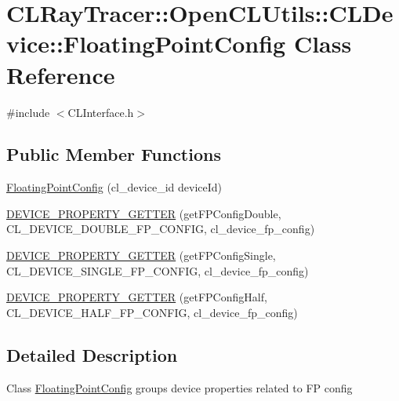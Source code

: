 \hypertarget{class_c_l_ray_tracer_1_1_open_c_l_utils_1_1_c_l_device_1_1_floating_point_config}{}\section{C\+L\+Ray\+Tracer\+:\+:Open\+C\+L\+Utils\+:\+:C\+L\+Device\+:\+:Floating\+Point\+Config Class Reference}
\label{class_c_l_ray_tracer_1_1_open_c_l_utils_1_1_c_l_device_1_1_floating_point_config}


{\ttfamily \#include $<$C\+L\+Interface.\+h$>$}

\subsection*{Public Member Functions}
\begin{DoxyCompactItemize}
\item 
\hyperlink{class_c_l_ray_tracer_1_1_open_c_l_utils_1_1_c_l_device_1_1_floating_point_config_a748826546a7d54bc90f9fed13c65bb7b}{Floating\+Point\+Config} (cl\+\_\+device\+\_\+id device\+Id)
\item 
\hyperlink{class_c_l_ray_tracer_1_1_open_c_l_utils_1_1_c_l_device_1_1_floating_point_config_a839e27c7d2ee35c0e375fbb31cdc829e}{D\+E\+V\+I\+C\+E\+\_\+\+P\+R\+O\+P\+E\+R\+T\+Y\+\_\+\+G\+E\+T\+T\+ER} (get\+F\+P\+Config\+Double, C\+L\+\_\+\+D\+E\+V\+I\+C\+E\+\_\+\+D\+O\+U\+B\+L\+E\+\_\+\+F\+P\+\_\+\+C\+O\+N\+F\+IG, cl\+\_\+device\+\_\+fp\+\_\+config)
\item 
\hyperlink{class_c_l_ray_tracer_1_1_open_c_l_utils_1_1_c_l_device_1_1_floating_point_config_a6429248cc2e9f877033c841ee3a1448a}{D\+E\+V\+I\+C\+E\+\_\+\+P\+R\+O\+P\+E\+R\+T\+Y\+\_\+\+G\+E\+T\+T\+ER} (get\+F\+P\+Config\+Single, C\+L\+\_\+\+D\+E\+V\+I\+C\+E\+\_\+\+S\+I\+N\+G\+L\+E\+\_\+\+F\+P\+\_\+\+C\+O\+N\+F\+IG, cl\+\_\+device\+\_\+fp\+\_\+config)
\item 
\hyperlink{class_c_l_ray_tracer_1_1_open_c_l_utils_1_1_c_l_device_1_1_floating_point_config_ad5d941dd74af6c5b2d7d3cd68e95555a}{D\+E\+V\+I\+C\+E\+\_\+\+P\+R\+O\+P\+E\+R\+T\+Y\+\_\+\+G\+E\+T\+T\+ER} (get\+F\+P\+Config\+Half, C\+L\+\_\+\+D\+E\+V\+I\+C\+E\+\_\+\+H\+A\+L\+F\+\_\+\+F\+P\+\_\+\+C\+O\+N\+F\+IG, cl\+\_\+device\+\_\+fp\+\_\+config)
\end{DoxyCompactItemize}


\subsection{Detailed Description}
Class \hyperlink{class_c_l_ray_tracer_1_1_open_c_l_utils_1_1_c_l_device_1_1_floating_point_config}{Floating\+Point\+Config} groups device properties related to FP config 

